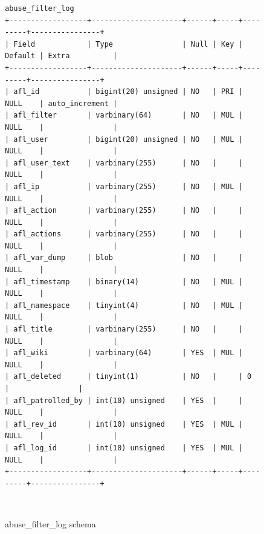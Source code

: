 \documentclass{sigchi}
\begin{document}
\begin{figure}
\begin{verbatim}
abuse_filter_log
+------------------+---------------------+------+-----+---------+----------------+
| Field            | Type                | Null | Key | Default | Extra          |
+------------------+---------------------+------+-----+---------+----------------+
| afl_id           | bigint(20) unsigned | NO   | PRI | NULL    | auto_increment |
| afl_filter       | varbinary(64)       | NO   | MUL | NULL    |                |
| afl_user         | bigint(20) unsigned | NO   | MUL | NULL    |                |
| afl_user_text    | varbinary(255)      | NO   |     | NULL    |                |
| afl_ip           | varbinary(255)      | NO   | MUL | NULL    |                |
| afl_action       | varbinary(255)      | NO   |     | NULL    |                |
| afl_actions      | varbinary(255)      | NO   |     | NULL    |                |
| afl_var_dump     | blob                | NO   |     | NULL    |                |
| afl_timestamp    | binary(14)          | NO   | MUL | NULL    |                |
| afl_namespace    | tinyint(4)          | NO   | MUL | NULL    |                |
| afl_title        | varbinary(255)      | NO   |     | NULL    |                |
| afl_wiki         | varbinary(64)       | YES  | MUL | NULL    |                |
| afl_deleted      | tinyint(1)          | NO   |     | 0       |                |
| afl_patrolled_by | int(10) unsigned    | YES  |     | NULL    |                |
| afl_rev_id       | int(10) unsigned    | YES  | MUL | NULL    |                |
| afl_log_id       | int(10) unsigned    | YES  | MUL | NULL    |                |
+------------------+---------------------+------+-----+---------+----------------+
\end{verbatim}
  \caption{abuse\_filter\_log schema}~\label{fig:db-schemas-afl}
\end{figure}
\end{document}
